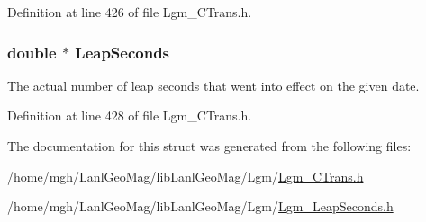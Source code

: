 Definition at line 426 of file Lgm\_\-CTrans.h.\hypertarget{struct_lgm___leap_seconds_47824494de1cdaafed7bee00b27b27af}{
\subsubsection[{LeapSeconds}]{\setlength{\rightskip}{0pt plus 5cm}double $\ast$ {\bf LeapSeconds}}}
\label{struct_lgm___leap_seconds_47824494de1cdaafed7bee00b27b27af}


The actual number of leap seconds that went into effect on the given date. 



Definition at line 428 of file Lgm\_\-CTrans.h.

The documentation for this struct was generated from the following files:\begin{CompactItemize}
\item 
/home/mgh/LanlGeoMag/libLanlGeoMag/Lgm/\hyperlink{_lgm___c_trans_8h}{Lgm\_\-CTrans.h}\item 
/home/mgh/LanlGeoMag/libLanlGeoMag/Lgm/\hyperlink{_lgm___leap_seconds_8h}{Lgm\_\-LeapSeconds.h}\end{CompactItemize}
